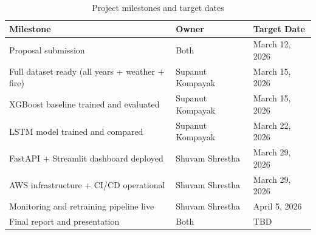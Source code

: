 \documentclass[12pt,a4paper]{report}
\begin{document}
\begin{table}[H]
\centering
\caption{Project milestones and target dates}
\label{tab:timeline}
\begin{tabular}{@{}lll@{}}
\toprule
\textbf{Milestone} & \textbf{Owner} & \textbf{Target Date} \\
\midrule
Proposal submission & Both & March 12, 2026 \\
Full dataset ready (all years + weather + fire) & Supanut Kompayak & March 15, 2026 \\
XGBoost baseline trained and evaluated & Supanut Kompayak & March 15, 2026 \\
LSTM model trained and compared & Supanut Kompayak & March 22, 2026 \\
FastAPI + Streamlit dashboard deployed & Shuvam Shrestha & March 29, 2026 \\
AWS infrastructure + CI/CD operational & Shuvam Shrestha & March 29, 2026 \\
Monitoring and retraining pipeline live & Shuvam Shrestha & April 5, 2026 \\
Final report and presentation & Both & TBD \\
\bottomrule
\end{tabular}
\end{table}

\renewcommand{\bibname}{REFERENCES}
\end{document}

